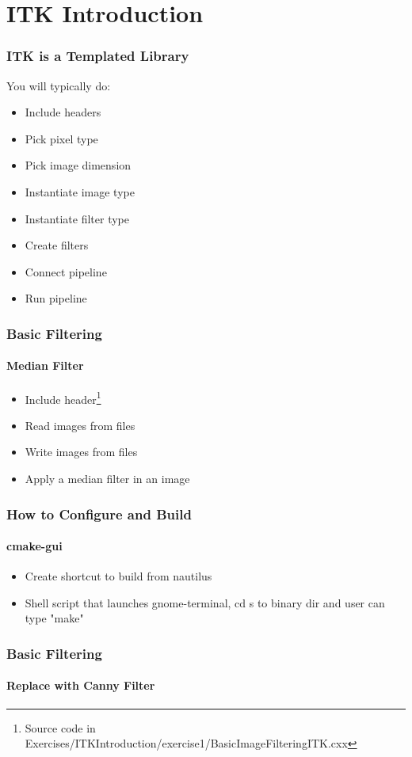\section{ITK Introduction}



\begin{frame}
\frametitle{ITK is a Templated Library}
You will typically do:
\begin{itemize}
\item Include headers
\pause
\item Pick pixel type
\pause
\item Pick image dimension
\pause
\item Instantiate image type
\pause
\item Instantiate filter type
\pause
\item Create filters
\pause
\item Connect pipeline
\pause
\item Run pipeline
\end{itemize}
\end{frame}

{
\begin{frame}[fragile]
\frametitle{Basic Filtering}
\framesubtitle{Median Filter}
\begin{itemize}
\item Include header\footnote{Source code in Exercises/ITKIntroduction/exercise1/BasicImageFilteringITK.cxx}
\end{itemize}
\begin{center}

\end{center}
\pause
\begin{itemize}
\item Read images from files
\item Write images from files
\item Apply a median filter in an image
\end{itemize}
\end{frame}
}

\begin{frame}
\frametitle{How to Configure and Build}
\framesubtitle{cmake-gui}
\begin{itemize}
\item Create shortcut to build from nautilus
\item Shell script that launches gnome-terminal, cd s to binary dir and user can type "make"
\end{itemize}
\end{frame}


\begin{frame}
\frametitle{Basic Filtering}
\framesubtitle{Replace with Canny Filter}
\begin{center}

\end{center}
\end{frame}
